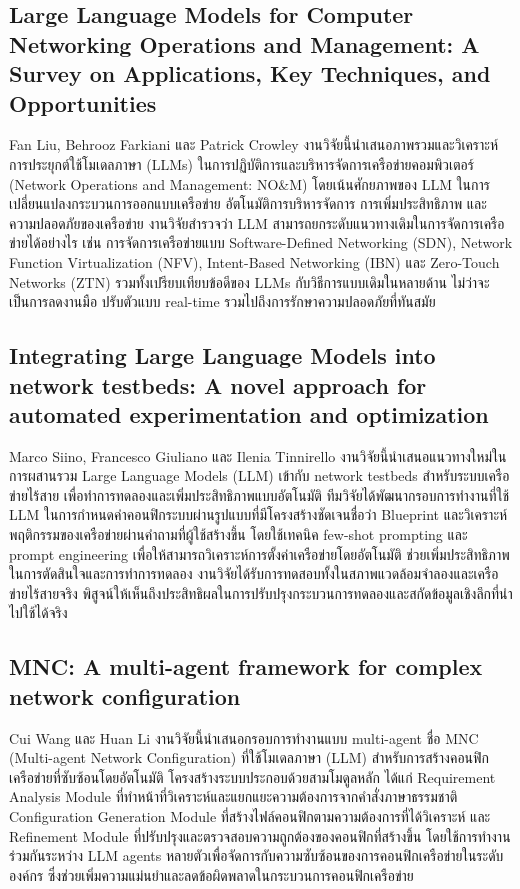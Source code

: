 \subsection{Large Language Models for Computer Networking  Operations and Management: A Survey on Applications, Key Techniques, and Opportunities}
\hspace*{1.3em} %
Fan Liu, Behrooz Farkiani และ Patrick Crowley งานวิจัยนี้นำเสนอภาพรวมและวิเคราะห์การประยุกต์ใช้โมเดลภาษา (LLMs) ในการปฏิบัติการและบริหารจัดการเครือข่ายคอมพิวเตอร์ (Network Operations and Management: NO\&M) โดยเน้นศักยภาพของ LLM ในการเปลี่ยนแปลงกระบวนการออกแบบเครือข่าย อัตโนมัติการบริหารจัดการ การเพิ่มประสิทธิภาพ และความปลอดภัยของเครือข่าย งานวิจัยสำรวจว่า LLM สามารถยกระดับแนวทางเดิมในการจัดการเครือข่ายได้อย่างไร เช่น การจัดการเครือข่ายแบบ Software-Defined Networking (SDN), Network Function Virtualization (NFV), Intent-Based Networking (IBN) และ Zero-Touch Networks (ZTN) รวมทั้งเปรียบเทียบข้อดีของ LLMs กับวิธีการแบบเดิมในหลายด้าน ไม่ว่าจะเป็นการลดงานมือ ปรับตัวแบบ real-time รวมไปถึงการรักษาความปลอดภัยที่ทันสมัย \parencite{paper2}

\subsection{Integrating Large Language Models into network testbeds: A novel approach for automated experimentation and optimization}
\hspace*{1.3em} %
Marco Siino, Francesco Giuliano และ Ilenia Tinnirello งานวิจัยนี้นำเสนอแนวทางใหม่ในการผสานรวม Large Language Models (LLM) เข้ากับ network testbeds สำหรับระบบเครือข่ายไร้สาย เพื่อทำการทดลองและเพิ่มประสิทธิภาพแบบอัตโนมัติ ทีมวิจัยได้พัฒนากรอบการทำงานที่ใช้ LLM ในการกำหนดค่าคอนฟิกระบบผ่านรูปแบบที่มีโครงสร้างชัดเจนชื่อว่า Blueprint และวิเคราะห์พฤติกรรมของเครือข่ายผ่านคำถามที่ผู้ใช้สร้างขึ้น โดยใช้เทคนิค few-shot prompting และ prompt engineering เพื่อให้สามารถวิเคราะห์การตั้งค่าเครือข่ายโดยอัตโนมัติ ช่วยเพิ่มประสิทธิภาพในการตัดสินใจและการทำการทดลอง งานวิจัยได้รับการทดสอบทั้งในสภาพแวดล้อมจำลองและเครือข่ายไร้สายจริง พิสูจน์ให้เห็นถึงประสิทธิผลในการปรับปรุงกระบวนการทดลองและสกัดข้อมูลเชิงลึกที่นำไปใช้ได้จริง \parencite{paper3}

\subsection{MNC: A multi-agent framework for complex network configuration}
\hspace*{1.3em} %
Cui Wang และ Huan Li งานวิจัยนี้นำเสนอกรอบการทำงานแบบ multi-agent ชื่อ MNC (Multi-agent Network Configuration) ที่ใช้โมเดลภาษา (LLM) สำหรับการสร้างคอนฟิกเครือข่ายที่ซับซ้อนโดยอัตโนมัติ โครงสร้างระบบประกอบด้วยสามโมดูลหลัก ได้แก่ Requirement Analysis Module ที่ทำหน้าที่วิเคราะห์และแยกแยะความต้องการจากคำสั่งภาษาธรรมชาติ Configuration Generation Module ที่สร้างไฟล์คอนฟิกตามความต้องการที่ได้วิเคราะห์ และ Refinement Module ที่ปรับปรุงและตรวจสอบความถูกต้องของคอนฟิกที่สร้างขึ้น โดยใช้การทำงานร่วมกันระหว่าง LLM agents หลายตัวเพื่อจัดการกับความซับซ้อนของการคอนฟิกเครือข่ายในระดับองค์กร ซึ่งช่วยเพิ่มความแม่นยำและลดข้อผิดพลาดในกระบวนการคอนฟิกเครือข่าย \parencite{paper5}


